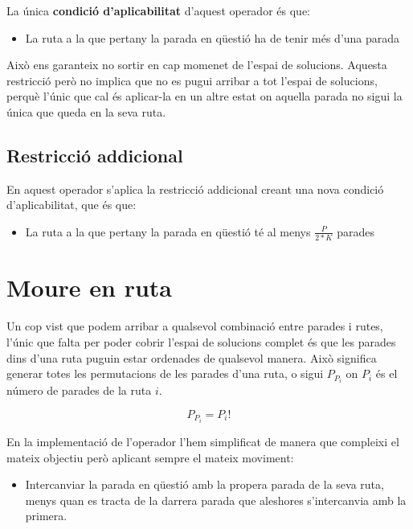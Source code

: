 La única \textbf{condició d'aplicabilitat} d'aquest operador és que:

\begin{itemize}
	\item La ruta a la que pertany la parada en qüestió ha de tenir més d'una parada
\end{itemize}

Això ens garanteix no sortir en cap momenet de l'espai de solucions. Aquesta restricció però no implica que no es pugui arribar a tot l'espai de solucions, perquè l'únic que cal és aplicar-la en un altre estat on aquella parada no sigui la única que queda en la seva ruta.

\subsection{Restricció addicional} %
\label{sub:restadd}

En aquest operador s'aplica la restricció addicional creant una nova condició d'aplicabilitat, que és que:

\begin{itemize}
	\item La ruta a la que pertany la parada en qüestió té al menys $\frac{P}{2*K}$ parades
\end{itemize}




\section{Moure en ruta} %
\label{sec:moure_en_ruta}

Un cop vist que podem arribar a qualsevol combinació entre parades i rutes, l'únic que falta per poder cobrir l'espai de solucions complet és que les parades dins d'una ruta puguin estar ordenades de qualsevol manera. Això significa generar totes les permutacions de les parades d'una ruta, o sigui $P_{P_i}$ on $P_i$ és el número de parades de la ruta $i$.

\[
	P_{P_i} = P_i!
\]

En la implementació de l'operador l'hem simplificat de manera que compleixi el mateix objectiu però aplicant sempre el mateix moviment:
\begin{itemize}
	\item Intercanviar la parada en qüestió amb la propera parada de la seva ruta, menys quan es tracta de la darrera parada que aleshores s'intercanvia amb la primera.
\end{itemize}

